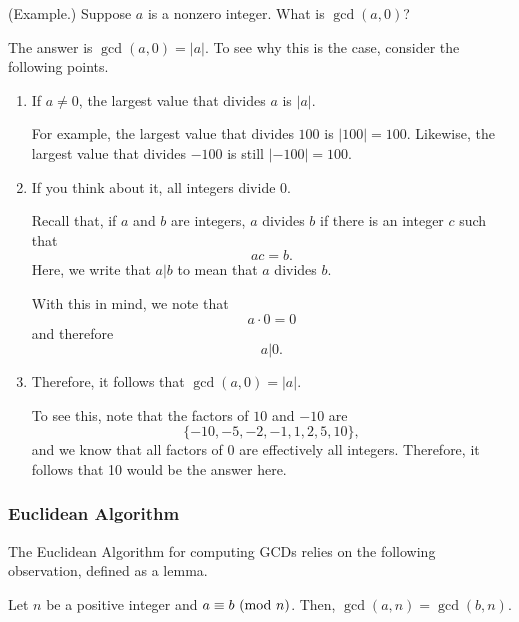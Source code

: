 \documentclass[letterpaper]{article}
\begin{document}
\begin{mdframed}
    (Example.) Suppose $a$ is a nonzero integer. What is $\gcd(a, 0)$?

    \begin{mdframed}
        The answer is $\gcd(a, 0) = |a|$. To see why this is the case, consider the following points. 

        \begin{enumerate}
            \item If $a \neq 0$, the largest value that divides $a$ is $|a|$. 
            \begin{mdframed}
                For example, the largest value that divides $100$ is $|100| = 100$. Likewise, the largest value that divides $-100$ is still $|-100| = 100$. 
            \end{mdframed}

            \item If you think about it, all integers divide 0. 
            \begin{mdframed}
                Recall that, if $a$ and $b$ are integers, $a$ divides $b$ if there is an integer $c$ such that 
                \[ac = b.\]
                Here, we write that $a | b$ to mean that $a$ divides $b$. 

                \bigskip 

                With this in mind, we note that 
                \[a \cdot 0 = 0\]
                and therefore 
                \[a | 0.\]
            \end{mdframed}

            \item Therefore, it follows that $\gcd(a, 0) = |a|$. 
            \begin{mdframed}
                To see this, note that the factors of $10$ and $-10$ are 
                \[\{-10, -5, -2, -1, 1, 2, 5, 10\},\]
                and we know that all factors of $0$ are effectively all integers. Therefore, it follows that 10 would be the answer here. 
            \end{mdframed}
        \end{enumerate}
    \end{mdframed}
\end{mdframed}

\subsubsection{Euclidean Algorithm}
The Euclidean Algorithm for computing GCDs relies on the following observation, defined as a lemma. 
\begin{lemma}{}{}
    Let $n$ be a positive integer and $a \equiv b \ (\mathrm{mod}\ n)$. Then, $\gcd(a, n) = \gcd(b, n)$. 
\end{lemma}
\end{document}
